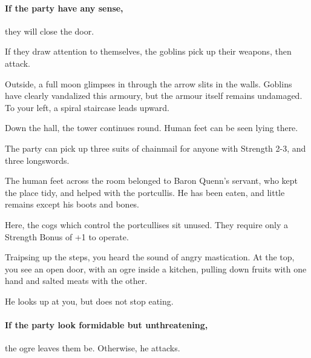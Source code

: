 \begin{multicols}{2}
\begin{boxtext}
\end{boxtext}

\paragraph{If the party have any sense,}
they will close the door.

If they draw attention to themselves, the goblins pick up their weapons, then attack.

\goblin


\begin{boxtext}

  Outside, a full moon glimpses in through the arrow slits in the walls.
  Goblins have clearly vandalized this armoury, but the armour itself remains undamaged.
  To your left, a spiral staircase leads upward.

  Down the hall, the tower continues round.
  Human feet can be seen lying there.

\end{boxtext}


The party can pick up three suits of chainmail for anyone with Strength 2-3, and three longswords.

The human feet across the room belonged to Baron Quenn's servant, who kept the place tidy, and helped with the portcullis.
He has been eaten, and little remains except his boots and bones.


Here, the cogs which control the portcullises sit unused.
They require only a Strength Bonus of +1 to operate.


\begin{boxtext}

  Traipsing up the steps, you heard the sound of angry mastication.
  At the top, you see an open door, with an ogre inside a kitchen, pulling down fruits with one hand and salted meats with the other.

  He looks up at you, but does not stop eating.

\end{boxtext}

\paragraph{If the party look formidable but unthreatening,}
the ogre leaves them be.
Otherwise, he attacks.


\end{multicols}
